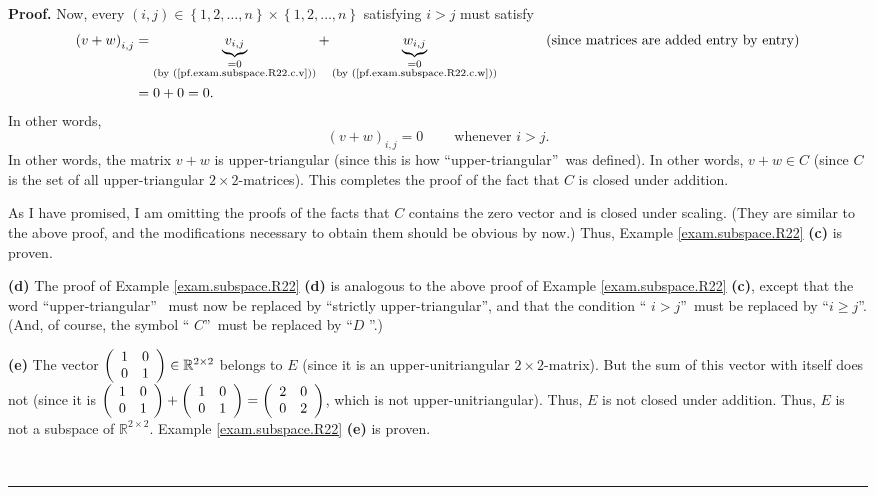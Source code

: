 \documentclass[numbers=enddot,12pt,final,onecolumn,notitlepage]{scrartcl}%
\theoremstyle{definition}
\newenvironment{proof}[1][Proof]{\noindent\textbf{#1.} }{\ \rule{0.5em}{0.5em}}
\begin{document}
\begin{proof}
Now, every $\left(  i,j\right)  \in\left\{  1,2,\ldots,n\right\}
\times\left\{  1,2,\ldots,n\right\}  $ satisfying $i>j$ must satisfy%
\begin{align*}
\left(  v+w\right)  _{i,j}  &  =\underbrace{v_{i,j}}_{\substack{=0\\\text{(by
(\ref{pf.exam.subspace.R22.c.v}))}}}+\underbrace{w_{i,j}}%
_{\substack{=0\\\text{(by (\ref{pf.exam.subspace.R22.c.w}))}}%
}\ \ \ \ \ \ \ \ \ \ \left(  \text{since matrices are added entry by
entry}\right) \\
&  =0+0=0.
\end{align*}
In other words,
\[
\left(  v+w\right)  _{i,j}=0\ \ \ \ \ \ \ \ \ \ \text{whenever }i>j.
\]
In other words, the matrix $v+w$ is upper-triangular (since this is how
\textquotedblleft upper-triangular\textquotedblright\ was defined). In other
words, $v+w\in C$ (since $C$ is the set of all upper-triangular $2\times
2$-matrices). This completes the proof of the fact that $C$ is closed under addition.

As I have promised, I am omitting the proofs of the facts that $C$ contains
the zero vector and is closed under scaling. (They are similar to the above
proof, and the modifications necessary to obtain them should be obvious by
now.) Thus, Example \ref{exam.subspace.R22} \textbf{(c)} is proven.

\textbf{(d)} The proof of Example \ref{exam.subspace.R22} \textbf{(d)} is
analogous to the above proof of Example \ref{exam.subspace.R22} \textbf{(c)},
except that the word \textquotedblleft upper-triangular\textquotedblright%
\ must now be replaced by \textquotedblleft strictly
upper-triangular\textquotedblright, and that the condition \textquotedblleft%
$i>j$\textquotedblright\ must be replaced by \textquotedblleft$i\geq
j$\textquotedblright. (And, of course, the symbol \textquotedblleft%
$C$\textquotedblright\ must be replaced by \textquotedblleft$D$%
\textquotedblright.)

\textbf{(e)} The vector $\left(
\begin{array}
[c]{cc}%
1 & 0\\
0 & 1
\end{array}
\right)  \in\mathbb{R}^{2\times2}$ belongs to $E$ (since it is an
upper-unitriangular $2\times2$-matrix). But the sum of this vector with itself
does not (since it is $\left(
\begin{array}
[c]{cc}%
1 & 0\\
0 & 1
\end{array}
\right)  +\left(
\begin{array}
[c]{cc}%
1 & 0\\
0 & 1
\end{array}
\right)  =\left(
\begin{array}
[c]{cc}%
2 & 0\\
0 & 2
\end{array}
\right)  $, which is not upper-unitriangular). Thus, $E$ is not closed under
addition. Thus, $E$ is not a subspace of $\mathbb{R}^{2\times2}$. Example
\ref{exam.subspace.R22} \textbf{(e)} is proven.


\end{proof}
\end{document}
